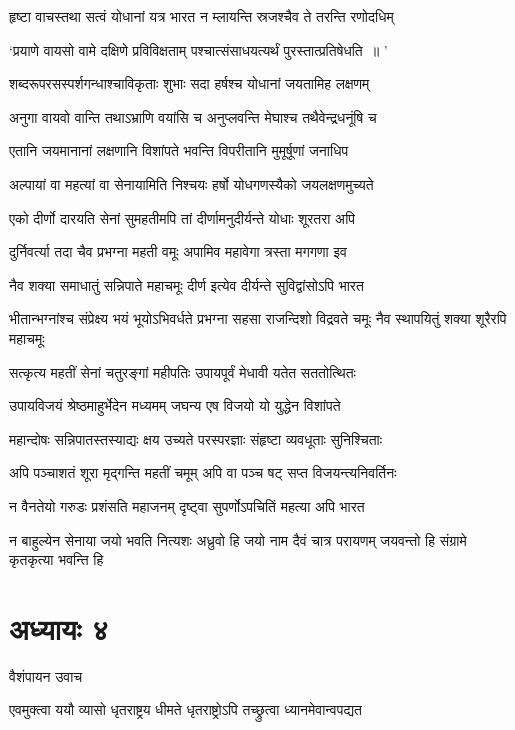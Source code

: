\twolineshloka
{हृष्टा वाचस्तथा सत्वं योधानां यत्र भारत}
{न म्लायन्ति स्रजश्चैव ते तरन्ति रणोदधिम्}


\twolineshloka
{`प्रयाणे वायसो वामे दक्षिणे प्रविविक्षताम्}
{पश्चात्संसाधयत्यर्थं पुरस्तात्प्रतिषेधति ॥ '}


\twolineshloka
{शब्दरूपरसस्पर्शगन्धाश्चाविकृताः शुभाः}
{सदा हर्षश्च योधानां जयतामिह लक्षणम्}


\twolineshloka
{अनुगा वायवो वान्ति तथाऽभ्राणि वयांसि च}
{अनुप्लवन्ति मेघाश्च तथैवेन्द्रधनूंषि च}


\twolineshloka
{एतानि जयमानानां लक्षणानि विशांपते}
{भवन्ति विपरीतानि मुमूर्षूणां जनाधिप}


\twolineshloka
{अल्पायां वा महत्यां वा सेनायामिति निश्चयः}
{हर्षो योधगणस्यैको जयलक्षणमुच्यते}


\twolineshloka
{एको दीर्णो दारयति सेनां सुमहतीमपि}
{तां दीर्णामनुदीर्यन्ते योधाः शूरतरा अपि}


\twolineshloka
{दुर्निवर्त्या तदा चैव प्रभग्ना महती वमूः}
{अपामिव महावेगा त्रस्ता मगगणा इव}


\twolineshloka
{नैव शक्या समाधातुं सन्निपाते महाचमूः}
{दीर्ण इत्येव दीर्यन्ते सुविद्वांसोऽपि भारत}


\threelineshloka
{भीतान्भग्नांश्च संप्रेक्ष्य भयं भूयोऽभिवर्धते}
{प्रभग्ना सहसा राजन्दिशो विद्रवते चमूः}
{नैव स्थापयितुं शक्या शूरैरपि महाचमूः}


\twolineshloka
{सत्कृत्य महतीं सेनां चतुरङ्गां महीपतिः}
{उपायपूर्वं मेधावी यतेत सततोत्थितः}


\twolineshloka
{उपायविजयं श्रेष्ठमाहुर्भेदेन मध्यमम्}
{जघन्य एष विजयो यो युद्धेन विशांपते}


\twolineshloka
{महान्दोषः सन्निपातस्तस्याद्यः क्षय उच्यते}
{परस्परज्ञाः संहृष्टा व्यवधूताः सुनिश्चिताः}


\twolineshloka
{अपि पञ्चाशतं शूरा मृद्गन्ति महतीं चमूम्}
{अपि वा पञ्च षट् सप्त विजयन्त्यनिवर्तिनः}


\twolineshloka
{न वैनतेयो गरुडः प्रशंसति महाजनम्}
{दृष्ट्वा सुपर्णोऽपचितिं महत्या अपि भारत}


\threelineshloka
{न बाहुल्येन सेनाया जयो भवति नित्यशः}
{अध्रुवो हि जयो नाम दैवं चात्र परायणम्}
{जयवन्तो हि संग्रामे कृतकृत्या भवन्ति हि}


\chapter{अध्यायः ४}
\twolineshloka
{वैशंपायन उवाच}
{}


\twolineshloka
{एवमुक्त्वा ययौ व्यासो धृतराष्ट्रय धीमते}
{धृतराष्ट्रोऽपि तच्छ्रुत्वा ध्यानमेवान्वपद्यत}


